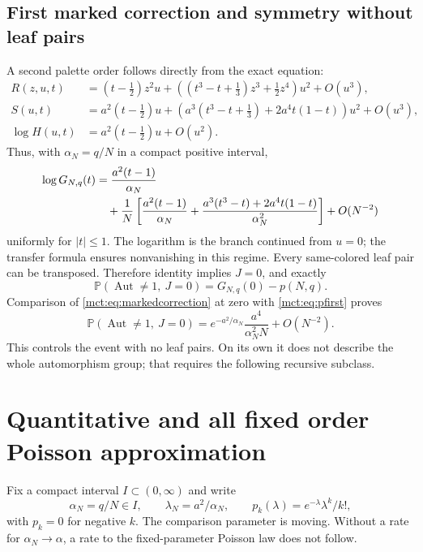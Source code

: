 \documentclass[11pt]{article}
\theoremstyle{definition}
\newcommand{\Aut}{\operatorname{Aut}}
\newcommand{\Prob}{\mathbb P}
\begin{document}
\subsection{First marked correction and symmetry without leaf pairs}
A second palette order follows directly from the exact equation:
\begin{align}
 R(z,u,t)&=(t-\tfrac12)z^2u+
 \left((t^3-t+\tfrac13)z^3+\tfrac12z^4\right)u^2+O(u^3),\\
 S(u,t)&=a^2(t-\tfrac12)u+
 \left(a^3(t^3-t+\tfrac13)+2a^4t(1-t)\right)u^2+O(u^3),\\
 \log H(u,t)&=a^2(t-\tfrac12)u+O(u^2).
\end{align}
Thus, with $\alpha_N=q/N$ in a compact positive interval,
\begin{align}\label{mct:eq:markedcorrection}
 \log G_{N,q}(t)
 &=\frac{a^2(t-1)}{\alpha_N}\notag\\
 &\quad+\frac1N\left[
 \frac{a^2(t-1)}{\alpha_N}+
 \frac{a^3(t^3-t)+2a^4t(1-t)}{\alpha_N^2}\right]+O(N^{-2})
\end{align}
uniformly for $|t|\le1$. The logarithm is the branch continued from $u=0$; the transfer formula ensures nonvanishing in this regime.
Every same-colored leaf pair can be transposed. Therefore identity implies $J=0$, and exactly
\[
 \Prob(\Aut\ne1,\ J=0)=G_{N,q}(0)-p(N,q).
\]
Comparison of \eqref{mct:eq:markedcorrection} at zero with \eqref{mct:eq:pfirst} proves
\begin{equation}\label{mct:eq:gap}
 \Prob(\Aut\ne1,\ J=0)
 =e^{-a^2/\alpha_N}\frac{a^4}{\alpha_N^2N}+O(N^{-2}).
\end{equation}
This controls the event with no leaf pairs. On its own it does not describe the whole automorphism group; that requires the following recursive subclass.


\section{Quantitative and all fixed order Poisson approximation}\label{mct:sec:tv}
Fix a compact interval $I\subset(0,\infty)$ and write
\[
 \alpha_N=q/N\in I,\qquad \lambda_N=a^2/\alpha_N,
 \qquad p_k(\lambda)=e^{-\lambda}\lambda^k/k!,
\]
with $p_k=0$ for negative $k$. The comparison parameter is moving. Without a rate for $\alpha_N\to\alpha$, a rate to the fixed-parameter Poisson law does not follow.
\end{document}
